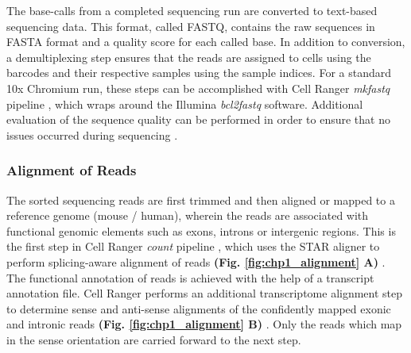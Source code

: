 The base-calls from a completed sequencing run are converted to text-based sequencing data. This format, called FASTQ, contains the raw sequences in FASTA format and a quality score for each called base. In addition to conversion, a demultiplexing step ensures that the reads are assigned to cells using the barcodes and their respective samples using the sample indices. For a standard 10x Chromium run, these steps can be accomplished with Cell Ranger \textit{mkfastq} pipeline \textbf{\cite{noauthor_generating_nodate}}, which wraps around the Illumina \textit{bcl2fastq} software. Additional evaluation of the sequence quality can be performed in order to ensure that no issues occurred during sequencing \textbf{\cite{andrews_fastqc_nodate}}.



\subsubsection{Alignment of Reads}


The sorted sequencing reads are first trimmed and then aligned or mapped to a reference genome (mouse / human), wherein the reads are associated with functional genomic elements such as exons, introns or intergenic regions. This is the first step in Cell Ranger \textit{count} pipeline \textbf{\cite{noauthor_running_nodate}}, which uses the STAR aligner to perform splicing-aware alignment of reads \textbf{(Fig. \ref{fig:chp1_alignment} A)} \textbf{\cite{dobin_star_2013}}. The functional annotation of reads is achieved with the help of a transcript annotation file. Cell Ranger performs an additional transcriptome alignment step to determine sense and anti-sense alignments of the confidently mapped exonic and intronic reads \textbf{(Fig. \ref{fig:chp1_alignment} B)} \textbf{\cite{noauthor_cell_nodate}}. Only the reads which map in the sense orientation are carried forward to the next step.

